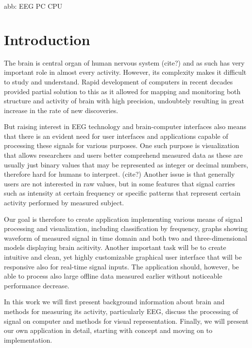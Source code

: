 abb:
EEG
PC
CPU

\chapter{Introduction}
The brain is central organ of human nervous system (cite?) and as such has very
important role in almost every activity. However, its complexity makes it
difficult to study and understand. Rapid development of computers in recent
decades provided partial solution to this as it allowed for mapping and
monitoring both structure and activity of brain with high precision,
undoubtely resulting in great increase in the rate of new discoveries.

But raising interest in EEG technology and brain-computer interfaces also means
that there is an evident need for user interfaces and applications capable of
processing these signals for various purposes. One such purpose is visualization
that allows researchers and users better comprehend measured data as these are
usually just binary values that may be represented as integer or decimal
numbers, therefore hard for humans to interpret. (cite?) Another issue is that
generally users are not interested in raw values, but in some features that
signal carries such as intensity at certain frequency or specific patterns that
represent certain activity performed by measured subject.

Our goal is therefore to create application implementing various means of signal
processing and visualization, including classification by frequency, graphs
showing waveform of measured signal in time domain and both two and
three-dimensional models displaying brain acitivity. Another important task will
be to create intuitive and clean, yet highly customizable graphical user
interface that will be responsive also for real-time signal inputs. The
application should, however, be able to process also large offline data measured
earlier without noticeable performance decrease.

In this work we will first present background information about brain and
methods for measuring its activity, particularly EEG, discuss the processing of
signal on computer and methods for visual representation. Finally, we will
present our own application in detail, starting with concept and moving on to
implementation.
 

